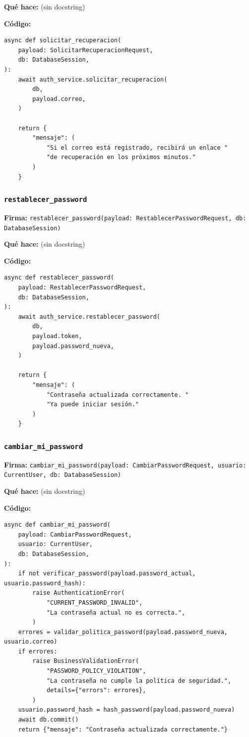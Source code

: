 \documentclass[11pt,a4paper]{article}
\begin{document}
\textbf{Qué hace:} (sin docstring)

\textbf{Código:}
\begin{lstlisting}
async def solicitar_recuperacion(
    payload: SolicitarRecuperacionRequest,
    db: DatabaseSession,
):
    await auth_service.solicitar_recuperacion(
        db,
        payload.correo,
    )

    return {
        "mensaje": (
            "Si el correo está registrado, recibirá un enlace "
            "de recuperación en los próximos minutos."
        )
    }
\end{lstlisting}

\subsubsection*{\texttt{restablecer\_password}}
\textbf{Firma:} \texttt{restablecer\_password(payload: RestablecerPasswordRequest, db: DatabaseSession)}

\textbf{Qué hace:} (sin docstring)

\textbf{Código:}
\begin{lstlisting}
async def restablecer_password(
    payload: RestablecerPasswordRequest,
    db: DatabaseSession,
):
    await auth_service.restablecer_password(
        db,
        payload.token,
        payload.password_nueva,
    )

    return {
        "mensaje": (
            "Contraseña actualizada correctamente. "
            "Ya puede iniciar sesión."
        )
    }
\end{lstlisting}

\subsubsection*{\texttt{cambiar\_mi\_password}}
\textbf{Firma:} \texttt{cambiar\_mi\_password(payload: CambiarPasswordRequest, usuario: CurrentUser, db: DatabaseSession)}

\textbf{Qué hace:} (sin docstring)

\textbf{Código:}
\begin{lstlisting}
async def cambiar_mi_password(
    payload: CambiarPasswordRequest,
    usuario: CurrentUser,
    db: DatabaseSession,
):
    if not verificar_password(payload.password_actual, usuario.password_hash):
        raise AuthenticationError(
            "CURRENT_PASSWORD_INVALID",
            "La contraseña actual no es correcta.",
        )
    errores = validar_politica_password(payload.password_nueva, usuario.correo)
    if errores:
        raise BusinessValidationError(
            "PASSWORD_POLICY_VIOLATION",
            "La contraseña no cumple la política de seguridad.",
            details={"errors": errores},
        )
    usuario.password_hash = hash_password(payload.password_nueva)
    await db.commit()
    return {"mensaje": "Contraseña actualizada correctamente."}
\end{lstlisting}
\end{document}
